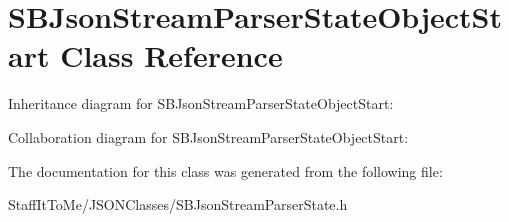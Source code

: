 \hypertarget{interface_s_b_json_stream_parser_state_object_start}{
\section{\-S\-B\-Json\-Stream\-Parser\-State\-Object\-Start \-Class \-Reference}
\label{interface_s_b_json_stream_parser_state_object_start}
}


\-Inheritance diagram for \-S\-B\-Json\-Stream\-Parser\-State\-Object\-Start\-:


\-Collaboration diagram for \-S\-B\-Json\-Stream\-Parser\-State\-Object\-Start\-:


\-The documentation for this class was generated from the following file\-:\begin{DoxyCompactItemize}
\item 
\-Staff\-It\-To\-Me/\-J\-S\-O\-N\-Classes/\-S\-B\-Json\-Stream\-Parser\-State.\-h\end{DoxyCompactItemize}

